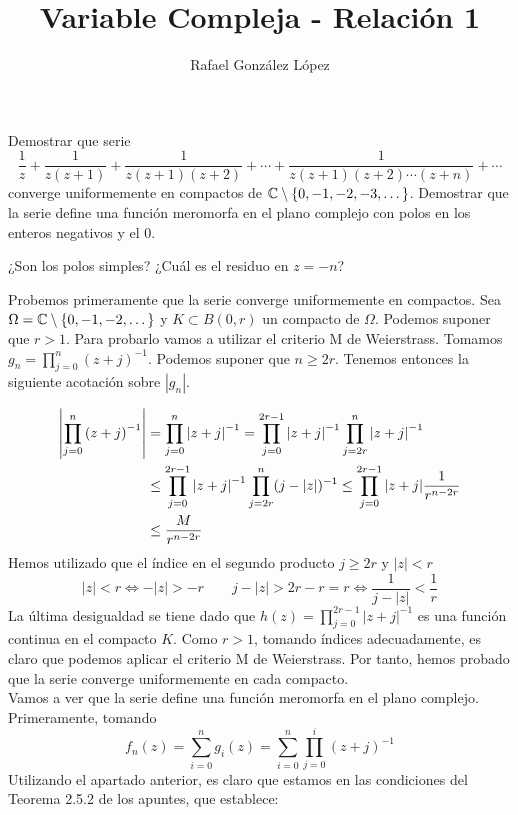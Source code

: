 \documentclass[twoside]{article}
\begin{document}
\title{Variable Compleja - Relación 1}
\author{Rafael González López}
\maketitle
\begin{ejercicio}{1}
Demostrar que serie 
$$
\frac{1}{z}+\frac{1}{z(z+1)}+\frac{1}{z(z+1)(z+2)}+\cdots + \frac{1}{z(z+1)(z+2)\cdots  (z+n)}+\cdots$$
converge uniformemente en compactos de $\mathbb{C}\setminus\{0,-1,-2,-3,\dotsc\}$. Demostrar que la serie define una función meromorfa en el plano complejo con polos en los enteros negativos y el $0$.

¿Son los polos simples? ¿Cuál es el residuo en $z=-n$?
\begin{solucion}
Probemos primeramente que la serie converge uniformemente en compactos. Sea $\Omega = \mathbb{C}\setminus\{0,-1,-2,\dotsc\}$ y $K\subset B(0,r)$ un compacto de $\Omega$. Podemos suponer que $r>1$. Para probarlo vamos a utilizar el criterio M de Weierstrass. Tomamos $g_n = \prod_{j=0}^n \left(z+j\right)^{-1}$. Podemos suponer que $n\geq 2r$.  Tenemos entonces la siguiente acotación sobre $|g_n|$.

\begin{align*}
\left\lvert\prod_{j=0}^n \left(z+j\right)^{-1}\right\rvert &= \prod_{j=0}^n \left|z+j\right|^{-1} =  \prod_{j=0}^{2r-1}\left|z+j\right|^{-1}  \prod_{j=2r}^n \left|z+j\right|^{-1}\\
&\leq  \prod_{j=0}^{2r-1}\left|z+j\right|^{-1}  \prod_{j=2r}^n (j-|z|)^{-1} \leq \prod_{j=0}^{2r-1}|z+j|\frac{1}{r^{n-2r}}\\
& \leq \frac{M}{r^{n-2r}}
\end{align*}
Hemos utilizado que el índice en el segundo producto $j\geq 2r$ y $|z|<r$
$$
|z|<r \Leftrightarrow -|z|>-r \qquad j-|z|> 2r-r = r \Leftrightarrow \frac{1}{j-|z|}< \frac{1}{r}
$$
\newpage
La última desigualdad se tiene dado que $h(z)=\prod_{j=0}^{2r-1}|z+j|^{-1}$ es una función continua en el compacto $K$. Como $r>1$, tomando índices adecuadamente, es claro que podemos aplicar el criterio M de Weierstrass. Por tanto, hemos probado que la serie converge uniformemente en cada compacto.\\

Vamos a ver que la serie define una función meromorfa en el plano complejo. Primeramente, tomando 
$$
 f_n(z) = \sum_{i=0}^n g_i(z) = \sum_{i=0}^n \prod_{j=0}^i (z+j)^{-1}
$$
Utilizando el apartado anterior, es claro que estamos en las condiciones del Teorema 2.5.2 de los apuntes, que establece:


\end{solucion}
\end{ejercicio}
\end{document}
